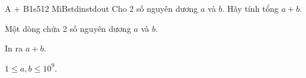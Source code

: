 \begin{problem}{A + B}{1s}{512 MiB}{stdin}{stdout}
Cho 2 số nguyên dương $a$ và $b$. Hãy tính tổng $a + b$.

\InputFile
Một dòng chứa 2 số nguyên dương $a$ và $b$.

\OutputFile
In ra $a + b$.

\Constraints
$1 \le a, b \le 10^9$.

\Example
\begin{example}
%
\end{example}
\end{problem}
